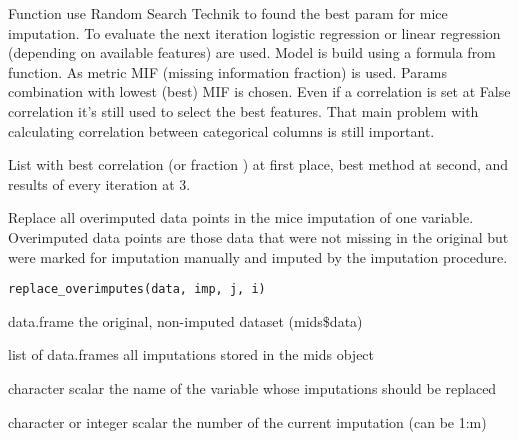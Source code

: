\documentclass[letterpaper]{book}
\begin{document}
%
\begin{Details}\relax
Function use Random Search Technik to found the best param for mice imputation. To evaluate the next iteration logistic regression or linear regression (depending on available features) are used. Model is build using a formula from  function. As metric MIF (missing information fraction) is used. Params combination with lowest (best) MIF is chosen. Even if a correlation is set at False correlation it's still used to select the best features. That main problem with
calculating correlation between categorical columns is still important.
\end{Details}
%
\begin{Value}
List with best correlation (or fraction ) at first place, best method at second, and results of every iteration at 3.
\end{Value}
%
\begin{Description}\relax
 Replace all overimputed data points in the mice imputation
of one variable. Overimputed data points are those data
that were not missing in the original but were marked for
imputation manually and imputed by the imputation procedure.

\end{Description}
%
\begin{Usage}
\begin{verbatim}
replace_overimputes(data, imp, j, i)
\end{verbatim}
\end{Usage}
%
\begin{Arguments}
\begin{ldescription}
\item[\code{data}] data.frame the original, non-imputed dataset (mids\$data)

\item[\code{imp}] list of data.frames all imputations stored in the mids object

\item[\code{j}] character scalar the name of the variable whose imputations should be replaced

\item[\code{i}] character or integer scalar the number of the current imputation (can be 1:m)
\end{ldescription}
\end{Arguments}
\end{document}
